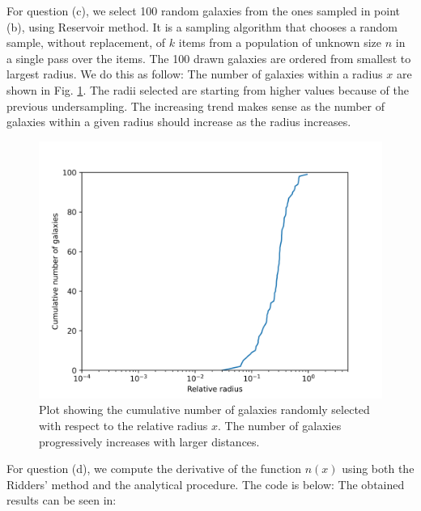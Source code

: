 For question (c), we select 100 random galaxies from the ones sampled in point (b), using Reservoir method. It is a sampling algorithm that chooses a random sample, without replacement, of $k$ items from a population of unknown size $n$ in a single pass over the items. The 100 drawn galaxies are ordered from smallest to largest radius. We do this as follow: 
The number of galaxies within a radius $x$ are shown in Fig. \ref{fig:cum_galaxies}. The radii selected are starting from higher values because of the previous undersampling. The increasing trend makes sense as the number of galaxies within a given radius should increase as the radius increases.

\begin{figure}[h!]
  \centering
  \includegraphics[width=0.9\linewidth]{./plots/my_solution_1c.png}
  \caption{Plot showing the cumulative number of galaxies randomly selected with respect to the relative radius $x$. The number of galaxies progressively increases with larger distances.}
  \label{fig:cum_galaxies}
\end{figure}

For question (d), we compute the derivative of the function $n(x)$ using both the Ridders' method and the analytical procedure. The code is below: 
The obtained results can be seen in: 


